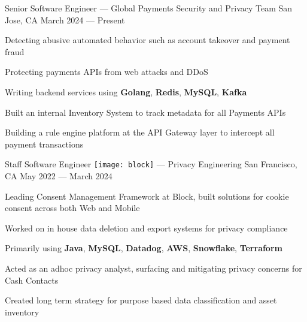 


\newlength{\myspacing}
\setlength{\myspacing}{0.5em}

\begin{cventries}


\cventry
{Senior Software Engineer} %
{ --- Global Payments Security and Privacy Team} %
{San Jose, CA} %
{March 2024 --- Present} %
{%
  \begin{cvitems}
    \item {Detecting abusive automated behavior such as account takeover and payment fraud}
    \item {Protecting payments APIs from web attacks and DDoS}
    \item {Writing backend services using \textbf{Golang}, \textbf{Redis}, \textbf{MySQL}, \textbf{Kafka}}
    \item {Built an internal Inventory System to track metadata for all Payments APIs}
    \item {Building a rule engine platform at the API Gateway layer to intercept all payment transactions}
  \end{cvitems}
}

\vspace{\myspacing}


\cventry
{Staff Software Engineer} %
{{\texttt{[image: block]}} --- Privacy Engineering} %
{San Francisco, CA} %
{May 2022 --- March 2024} %
{%
  \begin{cvitems}
    \item {Leading Consent Management Framework at Block, built solutions for cookie consent across both Web and Mobile}
    \item {Worked on in house data deletion and export systems for privacy compliance}
    \item {Primarily using \textbf{Java}, \textbf{MySQL}, \textbf{Datadog}, \textbf{AWS}, \textbf{Snowflake}, \textbf{Terraform}}
    \item {Acted as an adhoc privacy analyst, surfacing and mitigating privacy concerns for Cash Contacts}
    \item {Created long term strategy for purpose based data classification and asset inventory}
  \end{cvitems}
}


\end{cventries}

